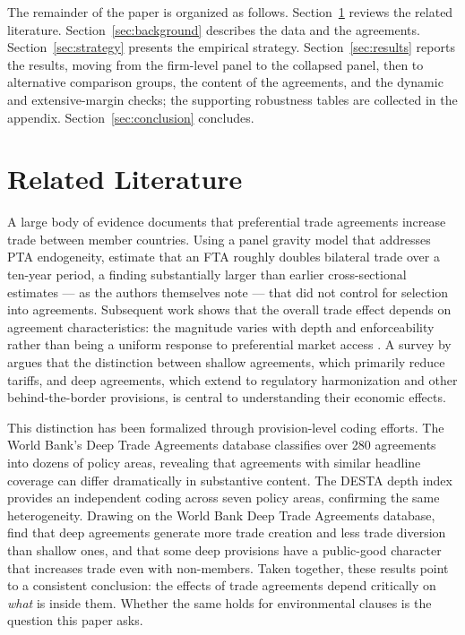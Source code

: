 \documentclass[12pt]{article}
\begin{document}
The remainder of the paper is organized as follows. Section~\ref{sec:lit} reviews the related literature. Section~\ref{sec:background} describes the data and the agreements. Section~\ref{sec:strategy} presents the empirical strategy. Section~\ref{sec:results} reports the results, moving from the firm-level panel to the collapsed panel, then to alternative comparison groups, the content of the agreements, and the dynamic and extensive-margin checks; the supporting robustness tables are collected in the appendix. Section~\ref{sec:conclusion} concludes.

\section{Related Literature}\label{sec:lit}

A large body of evidence documents that preferential trade agreements increase trade between member countries. Using a panel gravity model that addresses PTA endogeneity, \citet{baier2007} estimate that an FTA roughly doubles bilateral trade over a ten-year period, a finding substantially larger than earlier cross-sectional estimates --- as the authors themselves note --- that did not control for selection into agreements. Subsequent work shows that the overall trade effect depends on agreement characteristics: the magnitude varies with depth and enforceability rather than being a uniform response to preferential market access \citep{baier2009}. A survey by \citet{freund2010} argues that the distinction between shallow agreements, which primarily reduce tariffs, and deep agreements, which extend to regulatory harmonization and other behind-the-border provisions, is central to understanding their economic effects.

This distinction has been formalized through provision-level coding efforts. The World Bank's Deep Trade Agreements database \citep{hofmann2017} classifies over 280 agreements into dozens of policy areas, revealing that agreements with similar headline coverage can differ dramatically in substantive content. The DESTA depth index \citep{dur2014} provides an independent coding across seven policy areas, confirming the same heterogeneity. Drawing on the World Bank Deep Trade Agreements database, \citet{mattoo2022} find that deep agreements generate more trade creation and less trade diversion than shallow ones, and that some deep provisions have a public-good character that increases trade even with non-members. Taken together, these results point to a consistent conclusion: the effects of trade agreements depend critically on \emph{what} is inside them. Whether the same holds for environmental clauses is the question this paper asks.
\end{document}
